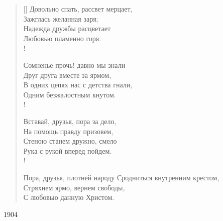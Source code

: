 \poemtitle{}
\settowidth{\versewidth}{Довольно спать, рассвет мерцает,}
\begin{verse}[\versewidth]
Довольно спать, рассвет мерцает,\\
Зажглась желанная заря;\\
Надежда дружбы расцветает\\
Любовью пламенно горя.\\!

Сомненье прочь! давно мы знали\\
Друг друга вместе за ярмом,\\
В одних цепях нас с детства гнали,\\
Одним безжалостным кнутом.\\!

Вставай, друзья, пора за дело,\\
На помощь правду призовем,\\
Стеною станем дружно, смело\\
Рука с рукой вперед пойдем.\\!

Пора, друзья, плотней народу
Сродниться внутренним крестом,\\
Стряхнем ярмо, вернем свободы,\\
С любовью данную Христом.
\end{verse}
1904


